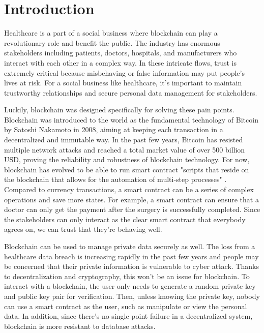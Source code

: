 \documentclass{article}
\begin{document}
\section{Introduction}
Healthcare is a part of a social business where blockchain can play a revolutionary role and benefit the public\cite{Business}. The industry has enormous stakeholders including patients, doctors, hospitals, and manufacturers who interact with each other in a complex way. In these intricate flows, trust is extremely critical because misbehaving or false information may put people's lives at risk. For a social business like healthcare, it's important to maintain trustworthy relationships and secure personal data management for stakeholders.
\par Luckily, blockchain was designed specifically for solving these pain points. Blockchain was introduced to the world as the fundamental technology of Bitcoin by Satoshi Nakamoto in 2008, aiming at keeping each transaction in a decentralized and immutable way\cite{Bitcoin}. In the past few years, Bitcoin has resisted multiple network attacks and reached a total market value of over 500 billion USD, proving the reliability and robustness of blockchain technology. For now, blockchain has evolved to be able to run smart contract "scripts that reside on the blockchain that allows for the automation of multi-step processes" \cite{SmartContract}. Compared to currency transactions, a smart contract can be a series of complex operations and save more states. For example, a smart contract can ensure that a doctor can only get the payment after the surgery is successfully completed. Since the stakeholders can only interact as the clear smart contract that everybody agrees on, we can trust that they're behaving well. 
\par Blockchain can be used to manage private data securely as well. The loss from a healthcare data breach is increasing rapidly in the past few years and people may be concerned that their private information is vulnerable to cyber attack\cite{breach}. Thanks to decentralization and cryptography, this won't be an issue for blockchain. To interact with a blockchain, the user only needs to generate a random private key and public key pair for verification. Then, unless knowing the private key, nobody can use a smart contract as the user, such as manipulate or view the personal data. In addition, since there's no single point failure in a decentralized system, blockchain is more resistant to database attacks.
\end{document}
